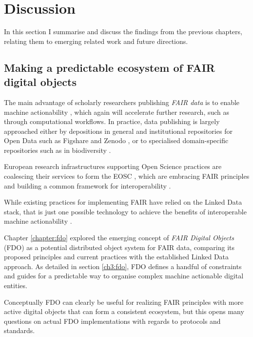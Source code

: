 \section{Discussion}
\label{ch61:discuss}

In this section I summarise and discuss the findings from the previous chapters, relating them to emerging related work and future directions.

\subsection{Making a predictable ecosystem of FAIR digital objects}
\label{ch61:ecosystem}

The main advantage of scholarly researchers publishing \emph{FAIR data} is to enable machine actionability \cite{Wilkinson 2016}, which again will accelerate further research, such as through computational workflows. 
In practice, data publishing is largely approached either by depositions in general and institutional repositories for Open Data such as Figshare and Zenodo \cite{Dillen 2019a}, or to specialised domain-specific repositories such as in biodiversity \cite{GBIF 2021}. 

European research infrastructures supporting Open Science practices are coalescing their services to form the
\acrfull{EOSC}
 \cite{Ayris 2016}, which are embracing \acrshort{FAIR} principles \cite{Mons 2017} and building a common framework for interoperability \cite{Kurowski 2021}. 

While existing practices for implementing FAIR have relied on the Linked Data stack, that is just one possible technology to achieve the benefits of interoperable machine actionability \cite{Mons 2017}. 

Chapter \ref{chapter:fdo} explored the emerging concept of \emph{FAIR Digital Objects} (\acrshort{FDO}) \cite{Schultes 2019} as a potential distributed object system for FAIR data, comparing its proposed principles and current practices with the established Linked Data approach. 
As detailed in section \vref{ch3:fdo}, FDO defines a handful of constraints and guides for a predictable way to organise complex machine actionable digital entities. 

Conceptually FDO can clearly be useful for realizing FAIR principles with more active digital objects that can form a consistent ecosystem, but this opens many questions on actual FDO implementations with regards to protocols and standards.

